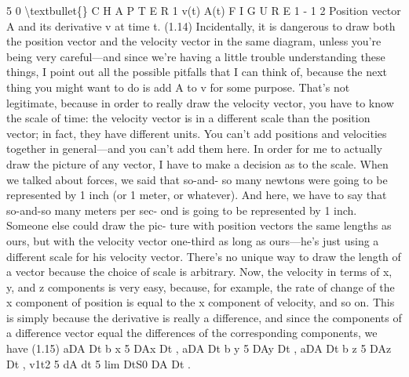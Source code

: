 \documentclass[10pt,oneside]{article}
\begin{document}
5 0 \textbackslash{}textbullet\{\} C H A P T E R  1 v(t) A(t) F I G U R E 1 - 1 2 Position vector A and its derivative v at time t. (1.14) Incidentally, it is dangerous to draw both the position vector and the velocity vector in the same diagram, unless you’re being very careful---and since we’re having a little trouble understanding these things, I point out all the possible pitfalls that I can think of, because the next thing you might want to do is add A to v for some purpose. That’s not legitimate, because in order to really draw the velocity vector, you have to know the scale of time: the velocity vector is in a different scale than the position vector; in fact, they have different units. You can’t add positions and velocities together in general---and you can’t add them here. In order for me to actually draw the picture of any vector, I have to make a decision as to the scale. When we talked about forces, we said that so-and- so many newtons were going to be represented by 1 inch (or 1 meter, or whatever). And here, we have to say that so-and-so many meters per sec- ond is going to be represented by 1 inch. Someone else could draw the pic- ture with position vectors the same lengths as ours, but with the velocity vector one-third as long as ours---he’s just using a different scale for his velocity vector. There’s no unique way to draw the length of a vector because the choice of scale is arbitrary. Now, the velocity in terms of x, y, and z components is very easy, because, for example, the rate of change of the x component of position is equal to the x component of velocity, and so on. This is simply because the derivative is really a difference, and since the components of a difference vector equal the differences of the corresponding components, we have (1.15) aDA Dt b x 5 DAx Dt , aDA Dt b y 5 DAy Dt , aDA Dt b z 5 DAz Dt , v1t2 5 dA dt 5 lim DtS0 DA Dt .\par
\end{document}
